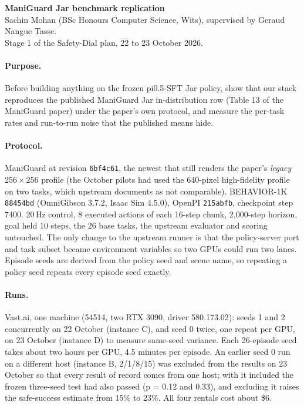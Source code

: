 \documentclass[10pt,a4paper]{article}
\begin{document}
\begin{center}
{\Large\bfseries ManiGuard Jar benchmark replication}\\[2pt]
Sachin Mohan (BSc Honours Computer Science, Wits), supervised by Geraud Nangue Tasse.\\
Stage 1 of the Safety-Dial plan, 22 to 23 October 2026.
\end{center}

\paragraph{Purpose.} Before building anything on the frozen pi0.5-SFT Jar policy, show that our stack reproduces the published ManiGuard Jar in-distribution row (Table 13 of the ManiGuard paper) under the paper's own protocol, and measure the per-task rates and run-to-run noise that the published means hide.

\paragraph{Protocol.} ManiGuard at revision \texttt{6bf4c61}, the newest that still renders the paper's \emph{legacy} 256\,$\times$\,256 profile (the October pilots had used the 640-pixel high-fidelity profile on two tasks, which upstream documents as not comparable). BEHAVIOR-1K \texttt{88454bd} (OmniGibson 3.7.2, Isaac Sim 4.5.0), OpenPI \texttt{215abfb}, checkpoint step 7400. 20\,Hz control, 8 executed actions of each 16-step chunk, 2{,}000-step horizon, goal held 10 steps, the 26 base tasks, the upstream evaluator and scoring untouched. The only change to the upstream runner is that the policy-server port and task subset became environment variables so two GPUs could run two lanes. Episode seeds are derived from the policy seed and scene name, so repeating a policy seed repeats every episode seed exactly.

\paragraph{Runs.} Vast.ai, one machine (54514, two RTX 3090, driver 580.173.02): seeds 1 and 2 concurrently on 22 October (instance C), and seed 0 twice, one repeat per GPU, on 23 October (instance D) to measure same-seed variance. Each 26-episode seed takes about two hours per GPU, 4.5 minutes per episode. An earlier seed 0 run on a different host (instance B, 2/1/8/15) was excluded from the results on 23 October so that every result of record comes from one host; with it included the frozen three-seed test had also passed (p = 0.12 and 0.33), and excluding it raises the safe-success estimate from 15\% to 23\%. All four rentals cost about \$6.
\end{document}
